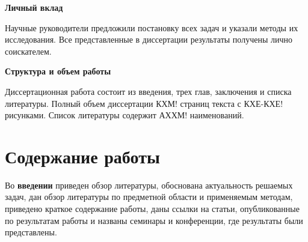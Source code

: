 \textbf{Личный вклад}

Научные руководители предложили постановку всех задач и указали методы их исследования. Все представленные в диссертации результаты получены лично соискателем. 

\textbf{Структура и объем работы}

Диссертационная работа состоит из введения, трех глав, заключения и списка литературы. Полный объем диссертации КХМ! страниц текста с КХЕ-КХЕ! рисунками. Список литературы содержит АХХМ! наименований.

\section*{Содержание работы}

Во \textbf{введении} приведен обзор литературы, обоснована актуальность решаемых задач, дан обзор литературы по предметной области и применяемым методам, приведено краткое содержание работы, даны ссылки на статьи, опубликованные по результатам работы и названы семинары и конференции, где результаты были представлены.

